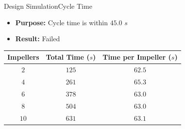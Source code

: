 \begin{frame}{Design Simulation}{Cycle Time}
\begin{itemize}
        \item \textbf{Purpose:} Cycle time is within $45.0$ $s$ 
        \item \textbf{Result:} Failed
\end{itemize}       
\begin{table}[!h]
\centering
\begin{tabular}{ccc}
    \hline
     \rowcolor{beamer@barcolor} Impellers & Total Time ($s$) & Time per Impeller ($s$) \\
     \hline
      $2$ & $125$ & $62.5$\\
      \rowcolor{beamer@barcolor} $4$ & $261$ & $65.3$ \\
      $6$ & $378$ & $63.0$ \\
      \rowcolor{beamer@barcolor} $8$ & $504$ & $63.0$\\
      $10$ & $631$ & $63.1$ \\
      \hline
\end{tabular}

\end{table}
\end{frame}